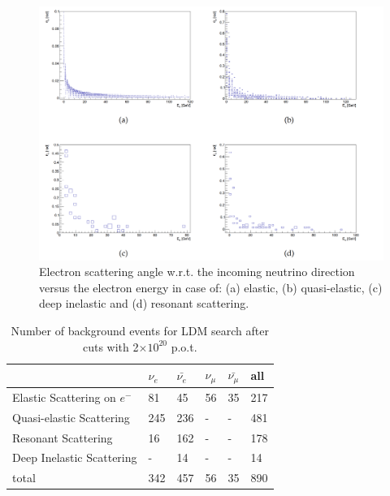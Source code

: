 \begin{itemize}
\begin{itemize}
      \begin{figure}[htbp]
    \centering  
    \includegraphics[scale=0.3]{figs/PhysicsPerformance/LDM_back.png}
    \caption{Electron scattering angle w.r.t. the incoming neutrino direction versus the electron energy in case of: (a) elastic, (b) quasi-elastic, (c) deep inelastic and (d) resonant scattering.}
    \label{fig:ldm_back}
    \end{figure}
    
    \begin{table}[htbp]
    \begin{center}
    \begin{tabular}{llllll}
    \hline
    & $\nu_e$ & $\bar{\nu_e}$ & $\nu_\mu$ & $\bar{\nu_\mu}$   & all  \\
    \hline
    Elastic Scattering on $e^-$   & 81  & 45  & 56 & 35 & 217\\
    Quasi-elastic Scattering      & 245 & 236 & -  & -  & 481 \\
    Resonant Scattering           & 16  & 162 & -  & -  & 178\\
    Deep Inelastic Scattering     &  -  & 14  & -  & -  & 14\\
    \hline
    total                         & 342 & 457 & 56  & 35& 890\\
 
    \end{tabular}
    \label{tab:ldm_back}
    \caption{Number of  background events for LDM search after cuts with 2$\times 10^{20}$ p.o.t.}  
    \end{center}
    \end{table}


\end{itemize}
\end{itemize}
